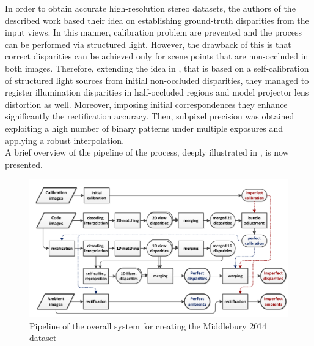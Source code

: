 In order to obtain accurate high-resolution stereo datasets, the authors of the described work based their idea on establishing ground-truth disparities from the input views.
In this manner, calibration problem are prevented and the process can be performed via structured light.
However, the drawback of this is that correct disparities can be achieved only for scene points that are non-occluded in both images.
Therefore, extending the idea in \cite{scharstein2003high}, that is based on a self-calibration of structured light sources from initial non-occluded disparities, they managed to register illumination disparities in half-occluded regions and model projector lens distortion as well. 
Moreover, imposing initial correspondences they enhance significantly the rectification accuracy.
Then, subpixel precision was obtained exploiting a high number of binary patterns under multiple exposures and applying a robust interpolation.\\
A brief overview of the pipeline of the process, deeply illustrated in \cite{Scharstein2014}, is now presented.\\

\begin{figure}[t]
	\begin{center}
		\includegraphics[width=.8\textwidth]{images/middlebury-2014-pipeline.png}
		\caption{Pipeline of the overall system for creating the Middlebury 2014 dataset \cite{Scharstein2014}}
		\label{fig:middleury-pipeline}
	\end{center}
\end{figure}

